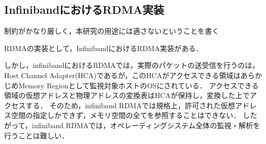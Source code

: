 
\subsection{InfinibandにおけるRDMA実装}

制約がかなり厳しく，本研究の用途には適さないということを書く

RDMAの実装として，Infiniband\cite{islam2012high}におけるRDMA実装がある．

しかし，infinibandにおけるRDMA\cite{infiniband-rdma}では，実際のパケットの送受信を行うのは，Host Channel Adapter(HCA)であるが，このHCAがアクセスできる領域はあらかじめMemory Regionとして監視対象ホストのOSにされている．
アクセスできる領域の仮想アドレスと物理アドレスの変換表はHCAが保持し，変換した上でアクセスする．
そのため，infiniband RDMAでは規格上，許可された仮想アドレス空間の指定しかできず，メモリ空間の全てを参照することはできない．
したがって，infiniband RDMAでは，オペレーティングシステム全体の監視・解析を行うことは難しい．

